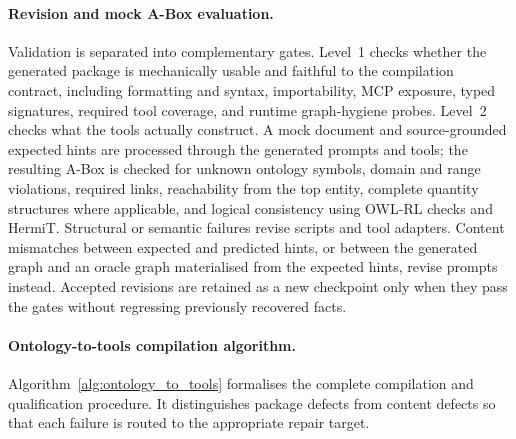 \paragraph{Revision and mock A-Box evaluation.}
Validation is separated into complementary gates. Level~1 checks whether the generated package is mechanically usable and faithful to the compilation contract, including formatting and syntax, importability, MCP exposure, typed signatures, required tool coverage, and runtime graph-hygiene probes. Level~2 checks what the tools actually construct. A mock document and source-grounded expected hints are processed through the generated prompts and tools; the resulting A-Box is checked for unknown ontology symbols, domain and range violations, required links, reachability from the top entity, complete quantity structures where applicable, and logical consistency using OWL-RL checks and HermiT. Structural or semantic failures revise scripts and tool adapters. Content mismatches between expected and predicted hints, or between the generated graph and an oracle graph materialised from the expected hints, revise prompts instead. Accepted revisions are retained as a new checkpoint only when they pass the gates without regressing previously recovered facts.

\paragraph{Ontology-to-tools compilation algorithm.}
Algorithm~\ref{alg:ontology_to_tools} formalises the complete compilation and qualification procedure. It distinguishes package defects from content defects so that each failure is routed to the appropriate repair target.

